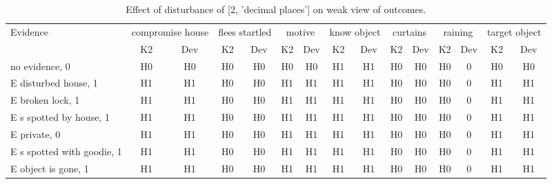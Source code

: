 \begin{table}\begin{tabular}{l|cc|cc|cc|cc|cc|cc|cc}\toprule\multirow{2}{*}{Evidence} & \multicolumn{2}{c}{compromise house}& \multicolumn{2}{c}{flees startled}& \multicolumn{2}{c}{motive}& \multicolumn{2}{c}{know object}& \multicolumn{2}{c}{curtains}& \multicolumn{2}{c}{raining}& \multicolumn{2}{c}{target object}\\& {K2} & {Dev}& {K2} & {Dev}& {K2} & {Dev}& {K2} & {Dev}& {K2} & {Dev}& {K2} & {Dev}& {K2} & {Dev}\\\midrule
no evidence, 0 & H0&H0&H0&H0&H0&H0&H1&H1&H0&H0&\cellcolor{Bittersweet}H0&\cellcolor{Bittersweet}0&H0&H0\\E disturbed house, 1 & H1&H1&H0&H0&H1&H1&H1&H1&H0&H0&\cellcolor{Bittersweet}H0&\cellcolor{Bittersweet}0&H1&H1\\E broken lock, 1 & H1&H1&H0&H0&H1&H1&H1&H1&H0&H0&\cellcolor{Bittersweet}H0&\cellcolor{Bittersweet}0&H1&H1\\E s spotted by house, 1 & H1&H1&H0&H0&H1&H1&H1&H1&H0&H0&\cellcolor{Bittersweet}H0&\cellcolor{Bittersweet}0&H1&H1\\E private, 0 & H1&H1&H0&H0&H1&H1&H1&H1&H0&H0&\cellcolor{Bittersweet}H0&\cellcolor{Bittersweet}0&H1&H1\\E s spotted with goodie, 1 & H1&H1&H0&H0&H1&H1&H1&H1&H0&H0&\cellcolor{Bittersweet}H0&\cellcolor{Bittersweet}0&H1&H1\\E object is gone, 1 & H1&H1&H0&H0&H1&H1&H1&H1&H0&H0&\cellcolor{Bittersweet}H0&\cellcolor{Bittersweet}0&H1&H1\\\bottomrule\end{tabular}\caption{Effect of disturbance of [2, 'decimal places'] on weak view of outcomes.}\end{table}